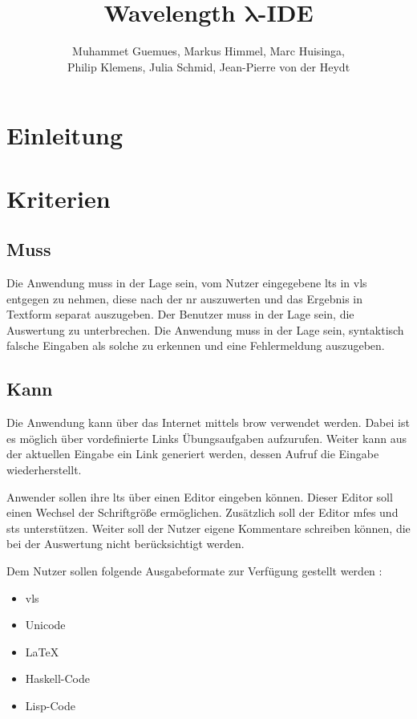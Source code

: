 \documentclass[parskip=full,11pt,twoside]{scrartcl}
\title{Wavelength $\bm{\lambda}$-IDE}
\author{Muhammet Guemues, Markus Himmel, Marc Huisinga,\\Philip Klemens, Julia Schmid, Jean-Pierre von der Heydt}
\begin{document}
\maketitle

\section{Einleitung}


\pagebreak
\section{Kriterien}

\subsection{Muss}
Die Anwendung muss in der Lage sein, vom Nutzer eingegebene \glspl{lt} in \gls{vls} entgegen zu nehmen, diese nach der \gls{nr} auszuwerten und das Ergebnis in Textform separat auszugeben. Der Benutzer muss in der Lage sein, die Auswertung zu unterbrechen.
Die Anwendung muss in der Lage sein, syntaktisch falsche Eingaben als solche zu erkennen und eine Fehlermeldung auszugeben.


\subsection{Kann}
Die Anwendung kann über das Internet mittels \gls{brow} verwendet werden.
Dabei ist es möglich über vordefinierte Links Übungsaufgaben aufzurufen. Weiter kann aus der aktuellen Eingabe ein Link generiert werden, dessen Aufruf die Eingabe wiederherstellt.

Anwender sollen ihre \glspl{lt} über einen Editor eingeben können. Dieser Editor soll einen Wechsel der Schriftgröße ermöglichen. Zusätzlich soll der Editor \glspl{mfe} und \glspl{st} unterstützen. Weiter soll der Nutzer eigene Kommentare schreiben können, die bei der Auswertung nicht berücksichtigt werden.

Dem Nutzer sollen folgende Ausgabeformate zur Verfügung gestellt werden : 
\begin{itemize}
\item \gls{vls}
\item Unicode
\item LaTeX
\item Haskell-Code
\item Lisp-Code
\end{itemize}
\end{document}
